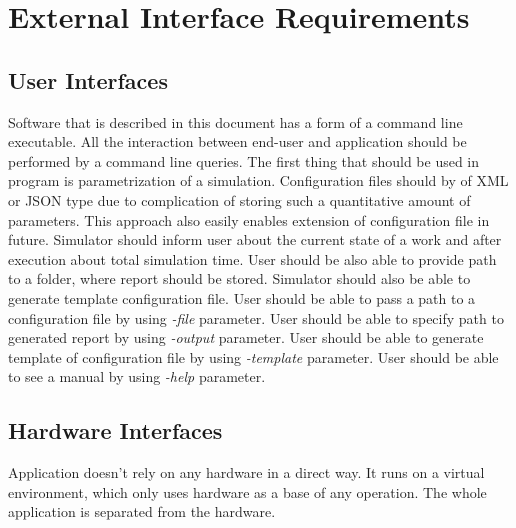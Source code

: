 
\chapter{External Interface Requirements} \label{chp:external-interface-requirements}

\section{User Interfaces}
	\begin{comment}
		$<$Describe the logical characteristics of each interface between the software 
		product and the users. This may include sample screen images, any GUI standards 
		or product family style guides that are to be followed, screen layout 
		constraints, standard buttons and functions (e.g., help) that will appear on 
		every screen, keyboard shortcuts, error message display standards, and so on.  
		Define the software components for which a user interface is needed. Details of 
		the user interface design should be documented in a separate user interface 
		specification.$>$
	\end{comment}
	Software that is described in this document has a form of a command line executable. All the interaction between end-user and application should be performed by a command line queries. The first thing that should be used in program is parametrization of a simulation. Configuration files should by of XML or JSON type due to complication of storing such a quantitative amount of parameters. This approach also easily enables extension of configuration file in future. Simulator should inform user about the current state of a work and after execution about total simulation time. User should be also able to provide path to a folder, where report should be stored. Simulator should also be able to generate template configuration file.
	{
		User should be able to pass a path to a configuration file by using \emph{-file} parameter.
	}
	{
		User should be able to specify path to generated report by using \emph{-output} parameter.
	}
	{
		User should be able to generate template of configuration file by using \emph{-template} parameter.
	}
	{
		User should be able to see a manual by using \emph{-help} parameter.
	}
\section{Hardware Interfaces}
	\begin{comment}
		$<$Describe the logical and physical characteristics of each interface between 
		the software product and the hardware components of the system. This may include 
		the supported device types, the nature of the data and control interactions 
		between the software and the hardware, and communication protocols to be 
		used.$>$
	\end{comment}
	Application doesn't rely on any hardware in a direct way. It runs on a virtual environment, which only uses hardware as a base of any operation. The whole application is separated from the hardware.
